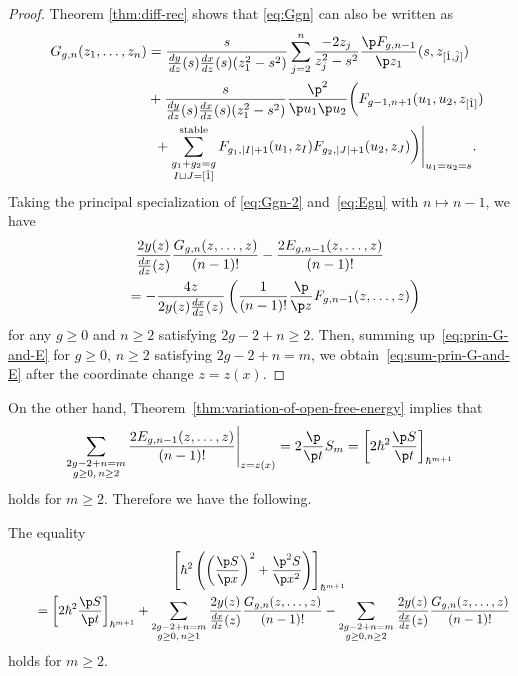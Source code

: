 \begin{proof}
Theorem \ref{thm:diff-rec} shows that
\eqref{eq:Ggn} can also be written as
\begin{gather}
G_{g,n}(z_{1},\dots,z_{n}) =
\frac{s}{\frac{dy}{dz}(s) \frac{dx}{dz}(s)(z_{1}^{2}-s^{2})}
\sum_{j=2}^{n} \frac{-2 z_{j}}{z_{j}^{2}-s^{2}}
\frac{\p F_{g,n-1}}{\p z_{1}}(s,z_{[\hat{1}, \hat{j}]})\nonumber
\\
\hphantom{G_{g,n}(z_{1},\dots,z_{n}) =}{}
+ \frac{s}{\frac{dy}{dz}(s) \frac{dx}{dz}(s)(z_{1}^{2}-s^{2})}
\frac{\p^{2}}{\p u_{1} \p u_{2}}
\biggl( F_{g-1,n+1}(u_{1},u_{2},z_{[\hat{1}]}) \nonumber\\
\hphantom{G_{g,n}(z_{1},\dots,z_{n}) =}{}+
\sum_{\substack{g_{1}+g_{2}=g \\ I \sqcup J = [\hat{1}]}}^{\rm stable}
F_{g_{1}, |I|+1}(u_{1},z_{I}) F_{g_{2}, |J|+1}(u_{2}, z_{J})
\biggr)\Biggr|_{u_{1}=u_{2}=s}.\label{eq:Ggn-2}
\end{gather}
Taking the principal specialization of \eqref{eq:Ggn-2} and~\eqref{eq:Egn} with $n \mapsto n-1$, we have
\begin{gather}
\frac{2y(z)}{\frac{dx}{dz}(z)}
\frac{G_{g,n}(z,\dots,z)}{(n-1)!} -
\frac{2 E_{g,n-1}(z,\dots,z)}{(n-1)!} \nonumber\\
\qquad{} =
- \frac{4z}{2y(z)\frac{dx}{dz}(z)}
\left(\frac{1}{(n-1)!} \frac{\p}{\p z} F_{g,n-1}(z,\dots,z)\right)\label{eq:prin-G-and-E}
\end{gather}
for any $g \ge 0$ and $n \ge 2$ satisfying
$2g-2+n \ge 2$.
Then, summing up~\eqref{eq:prin-G-and-E}
for $g \ge 0$, $n \ge 2$ satisfying $2g-2+n = m$,
we obtain~\eqref{eq:sum-prin-G-and-E} after
the coordinate change $z = z(x)$.
\end{proof}

On the other hand, Theorem~\ref{thm:variation-of-open-free-energy} implies that
\begin{gather*} %
\sum_{\substack{2g-2+n=m \\ g \ge 0,\,  n\ge 2 }}
\frac{2E_{g,n-1}(z,\dots,z)}{(n-1)!} \Biggr|_{z=z(x)}
= 2\frac{\p}{\p t} S_{m}
= \left[ 2\hbar^{2} \frac{\p S}{\p t} \right]_{\hbar^{m+1}}
\end{gather*}
holds for $m \ge 2$.
Therefore we have the following.

\begin{lem} \label{lem:tderivative-and-partial-Riccati}
The equality
\begin{gather*}%
\left[ \hbar^{2}\left( \left(\frac{\p S}{\p x}\right)^{2} +
\frac{\p^{2} S}{\p x^{2}} \right)  \right]_{\hbar^{m+1}} \\
\qquad{} =
\left[ 2\hbar^{2} \frac{\p S}{\p t} \right]_{\hbar^{m+1}} + \sum_{\substack{2g-2+n=m \\ g \ge 0,\, n\ge {1} }}
\frac{2y(z)}{\frac{dx}{dz}(z)}
\frac{G_{g,n}(z,\dots,z)}{(n-1)!} -
\sum_{\substack{2g-2+n=m \\ g \ge 0, n\ge {2} }}
\frac{2y(z)}{\frac{dx}{dz}(z)}
\frac{G_{g,n}(z,\dots,z)}{(n-1)!}
\end{gather*}
holds for $m \ge 2$.
\end{lem}


